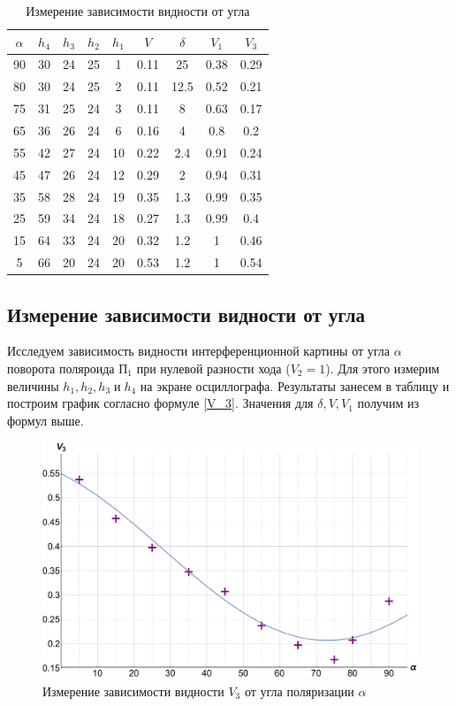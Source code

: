\documentclass[12pt]{kiarticle} %
\begin{document}
\begin{table}[h]
	\caption{Измерение зависимости видности от угла}
	\begin{center}
		\begin{tabular}{|c|c|c|c|c|c|c|c|c|}
			\hline
			$ 	\alpha  $ & $ h_4 $ &  $ h_3 $& $ h_2 $ & $ h_1 $ & $ V $ & $  \delta  $ & $ V_1 $ & $ V_3 $ \\
			\hline
			90 & 30 & 24 & 25 & 1 & 0.11 & 25 & 0.38 & 0.29 \\
			80 & 30 & 24 & 25 & 2 & 0.11 & 12.5 & 0.52 & 0.21 \\
			75 & 31 & 25 & 24 & 3 & 0.11 & 8 & 0.63 & 0.17 \\
			65 & 36 & 26 & 24 & 6 & 0.16 & 4 & 0.8 & 0.2 \\
			55 & 42 & 27 & 24 & 10 & 0.22 & 2.4 & 0.91 & 0.24 \\
			45 & 47 & 26 & 24 & 12 & 0.29 & 2 & 0.94 & 0.31 \\
			35 & 58 & 28 & 24 & 19 & 0.35 & 1.3 & 0.99 & 0.35 \\
			25 & 59 & 34 & 24 & 18 & 0.27 & 1.3 & 0.99 & 0.4 \\
			15 & 64 & 33 & 24 & 20 & 0.32 & 1.2 & 1 & 0.46 \\
			5 & 66 & 20 & 24 & 20 & 0.53 & 1.2 & 1 & 0.54 \\
			\hline
		\end{tabular}
	\end{center}
	\label{table_v3}
\end{table}

\subsection{Измерение зависимости видности от угла}

Исследуем зависимость видности интерференционной картины от угла
$ \alpha $ поворота поляроида $ П_1 $ при нулевой разности хода ($ V_2 = 1 $). Для этого измерим величины $ h_1, h_2, h_3 \; и \; h_4 $ на экране осциллографа. Результаты занесем в таблицу и построим график согласно формуле \eqref{V_3}. Значения для $ \delta, V, V_1 $ получим из формул выше.


		\begin{figure}[h]
	\label{graf_v3}
	\includegraphics[scale=0.47]{v3.pdf}
	\caption{Измерение зависимости видности $ V_3 $ от угла поляризации $ \alpha $}
\end{figure}
\end{document}
